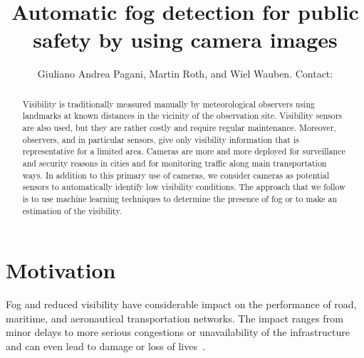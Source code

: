 \documentclass{article}
\title{Automatic fog detection for public safety by using camera images}
\author{Giuliano Andrea Pagani\affil{1}, Martin Roth\affil{1}, and Wiel Wauben\affil{1}. Contact: \email{pagani@knmi.nl}}
\begin{document}
\maketitle

\begin{abstract}
Visibility is traditionally measured manually by meteorological observers using landmarks at known distances in
the vicinity of the observation site. 
Visibility sensors are also used, but they are rather costly and
require regular maintenance. Moreover, observers, and in particular sensors, give only visibility information that is
representative for a limited area. 
Cameras are more and more deployed for surveillance and security reasons in cities and for monitoring traffic along
main transportation ways. In addition to this primary use of cameras, we consider cameras as potential sensors to
automatically identify low visibility conditions. 
The approach that we follow is to use machine learning techniques
to determine the presence of fog or to make an estimation of the visibility. 
\end{abstract}

\bcols %

\section*{Motivation}
Fog and reduced visibility have considerable impact on the performance of road, maritime, and aeronautical transportation
networks. The impact ranges from minor delays to more serious congestions or unavailability of the
infrastructure and can even lead to damage or loss of lives~\cite{gultepe2007fog}.
\end{document}
